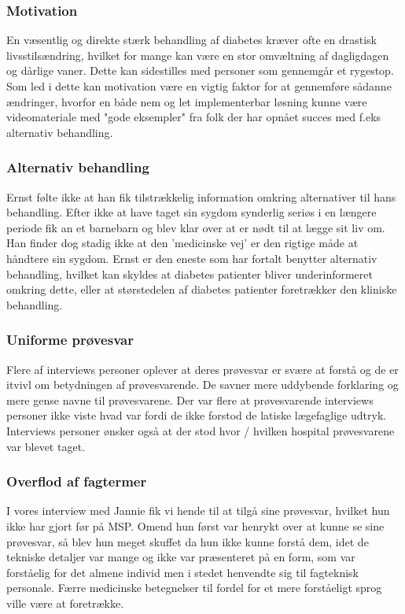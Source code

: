 \subsubsection{Motivation}
En væsentlig og direkte stærk behandling af diabetes kræver ofte en drastisk livsstilsændring, hvilket for mange kan være en stor omvæltning af dagligdagen og dårlige vaner. Dette kan sidestilles med personer som gennemgår et rygestop. Som led i dette kan motivation være en vigtig faktor for at gennemføre sådanne ændringer, hvorfor en både nem og let implementerbar løsning kunne være videomateriale med "gode eksempler" fra folk der har opnået succes med f.eks alternativ behandling.

\subsubsection{Alternativ behandling}
Ernst følte ikke at han fik tilstrækkelig information omkring alternativer til hans behandling. Efter ikke at have taget sin sygdom synderlig seriøs i en længere periode fik an et barnebarn og blev klar over at er nødt til at lægge sit liv om. Han finder dog stadig ikke at den 'medicinske vej' er den rigtige måde at håndtere sin sygdom. Ernst er den eneste som har fortalt benytter alternativ behandling, hvilket kan skyldes at diabetes patienter bliver underinformeret omkring dette, eller at størstedelen af diabetes patienter foretrækker den kliniske behandling. 

\subsubsection{Uniforme prøvesvar}
Flere af interviews personer oplever at deres prøvesvar er svære at forstå og de er itvivl om betydningen af prøvesvarende. De savner mere uddybende forklaring og mere gense navne til prøvesvarene. 
Der var flere at prøvesvarende interviews personer ikke viste hvad var fordi de ikke forstod de latiske lægefaglige udtryk.\\
Interviews personer ønsker også at der stod hvor / hvilken hospital prøvesvarene var blevet taget.

\subsubsection{Overflod af fagtermer}
I vores interview med Jannie fik vi hende til at tilgå sine prøvesvar, hvilket hun ikke har gjort før på MSP. Omend hun først var henrykt over at kunne se sine prøvesvar, så blev hun meget skuffet da hun ikke kunne forstå dem, idet de tekniske detaljer var mange og ikke var præsenteret på en form, som var forståelig for det almene individ men i stedet henvendte sig til fagteknisk personale. Færre medicinske betegnelser til fordel for et mere forståeligt sprog ville være at foretrække. 


